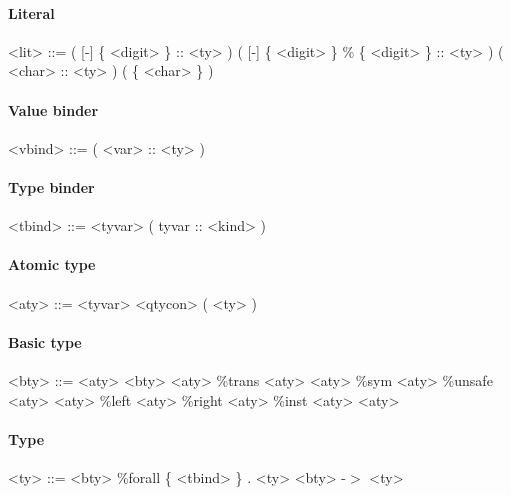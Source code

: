 \begin{scriptsize}
\paragraph{Literal}

\begin{grammar}
<lit> ::= ( [-] \{ <digit> \} :: <ty> )
     \alt ( [-] \{ <digit> \} \% \{ <digit> \} :: <ty> )
     \alt ( <char> :: <ty> )
     \alt ( \{ <char> \} )
\end{grammar}

\paragraph{Value binder}

\begin{grammar}
<vbind> ::= ( <var> :: <ty> )
\end{grammar}

\paragraph{Type binder}

\begin{grammar}
<tbind> ::= <tyvar>
       \alt ( tyvar :: <kind> )
\end{grammar}

\paragraph{Atomic type}

\begin{grammar}
<aty> ::= <tyvar>
     \alt <qtycon>
     \alt ( <ty> )
\end{grammar}

\paragraph{Basic type}

\begin{grammar}
<bty> ::= <aty>
     \alt <bty> <aty>
     \alt \%trans <aty> <aty>
     \alt \%sym <aty>
     \alt \%unsafe <aty> <aty>
     \alt \%left <aty>
     \alt \%right <aty>
     \alt \%inst <aty> <aty>
\end{grammar}

\paragraph{Type}

\begin{grammar}
<ty> ::= <bty>
    \alt \%forall \{ <tbind> \} . <ty>
    \alt <bty> -$>$ <ty>
\end{grammar}


\end{scriptsize}

